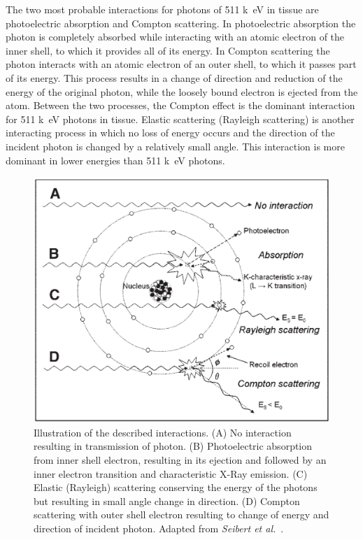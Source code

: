 The two most probable interactions for photons of 511 \si{k\electronvolt} in tissue are photoelectric absorption and Compton scattering. In photoelectric absorption the photon is completely absorbed while interacting with an atomic electron of the inner shell, to which it provides all of its energy. In Compton scattering the photon interacts with an atomic electron of an outer shell, to which it passes part of its energy. This process results in a change of direction and reduction of the energy of the original photon, while the loosely bound electron is ejected from the atom. Between the two processes, the Compton effect is the dominant interaction for 511 \si{k\electronvolt} photons in tissue. Elastic scattering (Rayleigh scattering) is another interacting process in which no loss of energy occurs and the direction of the incident photon is changed by a relatively small angle. This interaction is more dominant in lower energies than 511 \si{k\electronvolt} photons.
%
\begin{figure} [h!]
\centering
\includegraphics[scale=0.45,angle=0]{2_Theory_Methods/figures/Interactions.pdf}
\caption{Illustration of the described interactions. (A) No interaction resulting in transmission of photon. (B) Photoelectric absorption from inner shell electron, resulting in its ejection and followed by an inner electron transition and characteristic X-Ray emission. (C) Elastic (Rayleigh) scattering conserving the energy of the photons but resulting in small angle change in direction. (D) Compton scattering with outer shell electron resulting to change of energy and direction of incident photon. Adapted from \textit{Seibert et al.}~\cite{Seibert2005}.} 
\label{fig_2:511_interactions}
\end{figure} 
%
